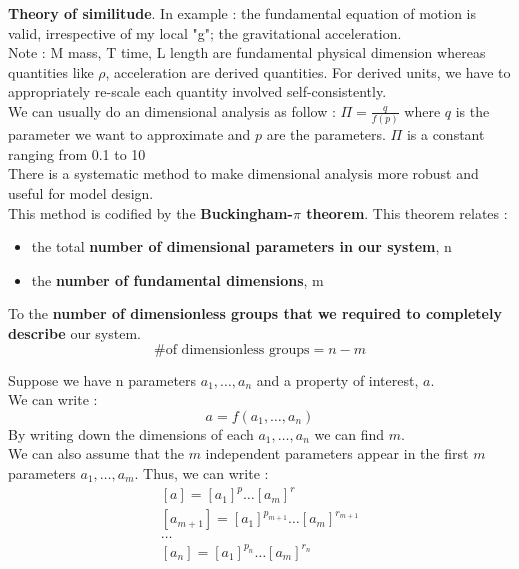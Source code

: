 \documentclass[../main.tex]{subfiles}
\begin{document}
\textbf{Theory of similitude}. In example : the fundamental equation of motion is valid, irrespective of my local "g"; the gravitational acceleration. \\

\color{gray}Note : M mass, T time, L length are fundamental physical dimension whereas quantities like $\rho$, acceleration are derived quantities. For derived units, we have to appropriately re-scale each quantity involved self-consistently. \color{black}\\

We can usually do an dimensional analysis as follow : $\Pi = \frac{q}{f(p)}$ where $q$ is the parameter we want to approximate and $p$ are the parameters. $\Pi$ is a constant ranging from 0.1 to 10\\

There is a systematic method to make dimensional analysis more robust and useful for model design.\\
This method is codified by the \textbf{Buckingham-$\pi$ theorem}. This theorem relates  : \begin{itemize}
    \item the total \textbf{number of dimensional parameters in our system}, n\\
    \item the \textbf{number of fundamental dimensions}, m\\
\end{itemize}
To the \textbf{number of dimensionless groups that we required to completely describe} our system.\\
\begin{equation}
    \# \text{of dimensionless groups} = n-m
\end{equation}

Suppose we have n parameters $a_1,\dots, a_n$ and a property of interest, $a$.\\
We can write : \begin{equation}
    a = f(a_1,\dots, a_n)
\end{equation}
By writing down the dimensions of each $a_1,\dots, a_n$ we can find $m$.\\
We can also assume that the $m$ independent parameters appear in the first $m$ parameters $a_1, \dots, a_m$. Thus, we can write : \\
\begin{equation}
    \begin{matrix}
        [a] = [a_1]^p\dots [a_m]^r\\
        [a_{m+1}] = [a_1]^{p_{m+1}}\dots [a_m]^{r_{m+1}}\\
        \dots\\
        [a_n] = [a_1]^{p_n} \dots [a_m]^{r_n}\\
    \end{matrix}
\end{equation}
\end{document}
